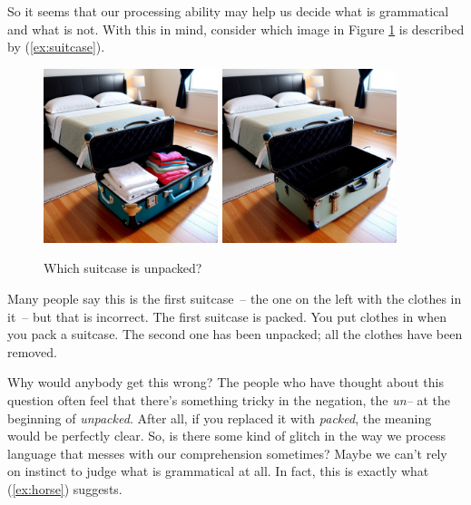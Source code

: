 So it seems that our processing ability may help us decide what is grammatical and what is not. With this in mind, consider which image in Figure \ref{fig:suitcases} is described by (\ref{ex:suitcase}).

\label{ex:suitcase}
\z

\begin{figure}
    \centering
    \includegraphics[width=2in]{figures/full_suitcase.png}
    \includegraphics[width=2in]{figures/empty_suitcase.png}
    \caption{Which suitcase is unpacked?}
    \label{fig:suitcases}
\end{figure}

Many people say this is the first suitcase~-- the one on the left with the clothes in it~-- but that is incorrect. The first suitcase is packed. You put clothes in when you pack a suitcase. The second one has been unpacked; all the clothes have been removed.

Why would anybody get this wrong? The people who have thought about this question often feel that there's something tricky in the negation, the \textit{un--} at the beginning of \textit{unpacked}. After all, if you replaced it with \textit{packed}, the meaning would be perfectly clear. So, is there some kind of glitch in the way we process language that messes with our comprehension sometimes? Maybe we can't rely on instinct to judge what is grammatical at all. In fact, this is exactly what (\ref{ex:horse}) suggests.

